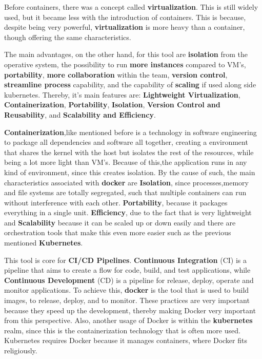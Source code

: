 Before containers, there was a concept called \textbf{virtualization}. This is still widely used, but it became less with the introduction of containers. This is because, despite being very powerful, \textbf{virtualization} is more heavy than a container, though offering the same characteristics.

The main advantages, on the other hand, for this tool are \textbf{isolation} from the operative system, the possibility to run \textbf{more instances} compared to VM's, \textbf{portability}, \textbf{more collaboration} within the team, \textbf{version control}, \textbf{streamline process} capability, and the capability of \textbf{scaling} if used along side kubernetes. Thereby, it's main features are: \textbf{Lightweight Virtualization}, \textbf{Containerization}, \textbf{Portability}, \textbf{Isolation}, \textbf{Version Control and Reusability}, and \textbf{Scalability and Efficiency}.

\textbf{Containerization},like mentioned before is a technology in software engineering to package all dependencies and software all together, creating a environment that shares the kernel with the host but isolates the rest of the resources, while being a lot more light than VM's. Because of this,the application runs in any kind of environment, since this creates isolation. By the cause of such, the main characteristics associated with \textbf{docker} are \textbf{Isolation}, since processes,memory and file systems are totally segregated, such that multiple containers can run without interference with each other. \textbf{Portability}, because it packages everything in a single unit. \textbf{Efficiency}, due to the fact that is very lightweight and \textbf{Scalability} because it can be scaled up or down easily and there are orchestration tools that make this even more easier such as the previous mentioned \textbf{Kubernetes}.

This tool is core for \textbf{CI/CD Pipelines}. \textbf{Continuous Integration} (CI) is a pipeline that aims to create a flow for code, build, and test applications, while \textbf{Continuous Development} (CD) is a pipeline for release, deploy, operate and monitor applications. To achieve this, \textbf{docker} is the tool that is used to build images, to release, deploy, and to monitor. These practices are very important because they speed up the development, thereby making Docker very important from this perspective. Also, another usage of Docker is within the \textbf{kubernetes} realm, since this is the containerization technology that is often more used. Kubernetes requires Docker because it manages containers, where Docker fits religiously.

